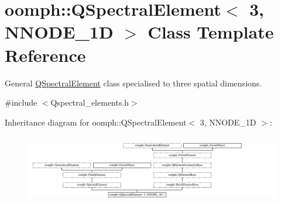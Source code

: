 \hypertarget{classoomph_1_1QSpectralElement_3_013_00_01NNODE__1D_01_4}{}\section{oomph\+:\+:Q\+Spectral\+Element$<$ 3, N\+N\+O\+D\+E\+\_\+1D $>$ Class Template Reference}
\label{classoomph_1_1QSpectralElement_3_013_00_01NNODE__1D_01_4}


General \hyperlink{classoomph_1_1QSpectralElement}{Q\+Spectral\+Element} class specialised to three spatial dimensions.  




{\ttfamily \#include $<$Qspectral\+\_\+elements.\+h$>$}

Inheritance diagram for oomph\+:\+:Q\+Spectral\+Element$<$ 3, N\+N\+O\+D\+E\+\_\+1D $>$\+:\begin{figure}[H]
\begin{center}
\leavevmode
\includegraphics[height=3.088235cm]{classoomph_1_1QSpectralElement_3_013_00_01NNODE__1D_01_4}
\end{center}
\end{figure}
